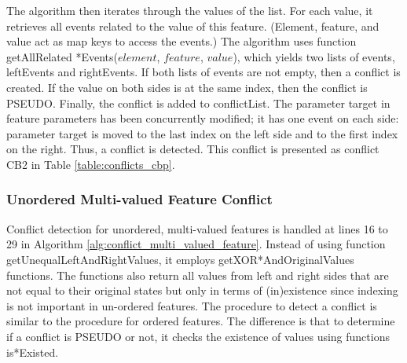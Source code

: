 The algorithm then iterates through the values of the list. For each value, it retrieves all events related to the value of this feature. (Element, feature, and value act as map keys to access the events.) The algorithm uses function \textsf{getAllRelated *Events($element$, $feature$, $value$)}, which yields two lists of events, \textsf{leftEvents} and \textsf{rightEvents}. If both lists of events are not empty, then a conflict is created. If the value on both sides is at the same index, then the conflict is \textsf{PSEUDO}. Finally, the conflict is added to \textsf{conflictList}. The parameter \textsf{target} in feature \textsf{parameters} has been concurrently modified; it has one event on each side: parameter \textsf{target} is moved to the last index on the left side and to the first index on the right. Thus, a conflict is detected. This conflict is presented as conflict \textsf{CB2} in Table \ref{table:conflicts_cbp}.


\subsubsection{Unordered Multi-valued Feature Conflict} 
\label{sec:unordered_conflict}
Conflict detection for unordered, multi-valued features is handled at lines 16 to 29 in Algorithm \ref{alg:conflict_multi_valued_feature}. Instead of using function \textsf{getUnequalLeftAndRightValues}, it employs \textsf{getXOR*AndOriginalValues} functions. The functions also return all values from left and right sides that are not equal to their original states but only in terms of (in)existence since indexing is not important in un-ordered features. The procedure to detect a conflict is similar to the procedure for ordered features. The difference is that to determine if a conflict is \textsf{PSEUDO} or not, it checks the existence of values using functions \textsf{is*Existed}.

